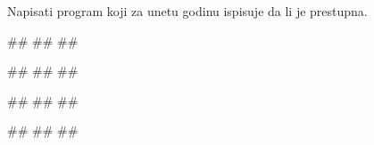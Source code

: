 \begin{Exercise}[label=v1.2_04] 
 Napisati program koji za unetu godinu ispisuje da li je prestupna.
 
\begin{miditest}
\begin{upotreba}{1}
#\naslovInt#
##
##
\end{upotreba}
\end{miditest}
\begin{miditest}
\begin{upotreba}{2}
#\naslovInt#
##
##
\end{upotreba}
\end{miditest}

\begin{miditest}
\begin{upotreba}{3}
#\naslovInt#
##
##
\end{upotreba}
\end{miditest}
\begin{miditest}
\begin{upotreba}{4}
#\naslovInt#
##
##
\end{upotreba}
\end{miditest}
\end{Exercise}
\begin{Answer}[ref=v1.2_04]
\end{Answer}


